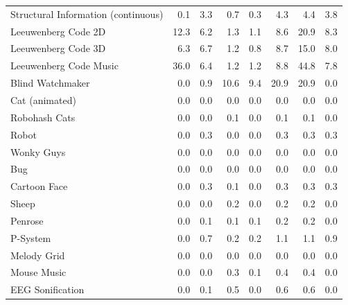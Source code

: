 \begin{tabular}{lrrrrrr|r}
Structural Information (continuous) & 0.1 & 3.3 & 0.7 & 0.3 & 4.3 & 4.4 & 3.8 \\
Leeuwenberg Code 2D & 12.3 & 6.2 & 1.3 & 1.1 & 8.6 & 20.9 & 8.3 \\
Leeuwenberg Code 3D & 6.3 & 6.7 & 1.2 & 0.8 & 8.7 & 15.0 & 8.0 \\
Leeuwenberg Code Music & 36.0 & 6.4 & 1.2 & 1.2 & 8.8 & 44.8 & 7.8 \\
Blind Watchmaker & 0.0 & 0.9 & 10.6 & 9.4 & 20.9 & 20.9 & 0.0 \\
Cat (animated) & 0.0 & 0.0 & 0.0 & 0.0 & 0.0 & 0.0 & 0.0 \\
Robohash Cats & 0.0 & 0.0 & 0.1 & 0.0 & 0.1 & 0.1 & 0.0 \\
Robot & 0.0 & 0.3 & 0.0 & 0.0 & 0.3 & 0.3 & 0.3 \\
Wonky Guys & 0.0 & 0.0 & 0.0 & 0.0 & 0.0 & 0.0 & 0.0 \\
Bug & 0.0 & 0.0 & 0.0 & 0.0 & 0.0 & 0.0 & 0.0 \\
Cartoon Face & 0.0 & 0.3 & 0.1 & 0.0 & 0.3 & 0.3 & 0.3 \\
Sheep & 0.0 & 0.0 & 0.2 & 0.0 & 0.2 & 0.2 & 0.0 \\
Penrose & 0.0 & 0.1 & 0.1 & 0.1 & 0.2 & 0.2 & 0.0 \\
P-System & 0.0 & 0.7 & 0.2 & 0.2 & 1.1 & 1.1 & 0.9 \\
Melody Grid & 0.0 & 0.0 & 0.0 & 0.0 & 0.0 & 0.0 & 0.0 \\
Mouse Music & 0.0 & 0.0 & 0.3 & 0.1 & 0.4 & 0.4 & 0.0 \\
EEG Sonification & 0.0 & 0.1 & 0.5 & 0.0 & 0.6 & 0.6 & 0.0 \\
\bottomrule
\end{tabular}
